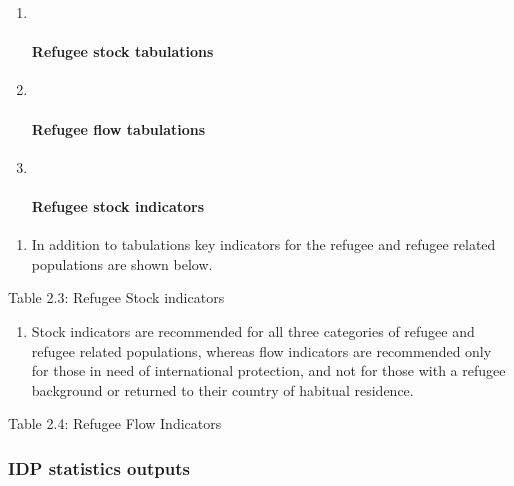 \documentclass[
]{article}
\providecommand{\tightlist}{%
  \setlength{\itemsep}{0pt}\setlength{\parskip}{0pt}}
\begin{document}
\begin{enumerate}
\def\labelenumi{\arabic{enumi})}
\item ~
  \hypertarget{refugee-stock-tabulations}{%
  \paragraph{Refugee stock tabulations}\label{refugee-stock-tabulations}}
\item ~
  \hypertarget{refugee-flow-tabulations}{%
  \paragraph{Refugee flow tabulations}\label{refugee-flow-tabulations}}
\item ~
  \hypertarget{refugee-stock-indicators}{%
  \paragraph{Refugee stock indicators}\label{refugee-stock-indicators}}
\end{enumerate}

\begin{enumerate}
\def\labelenumi{\arabic{enumi}.}
\setcounter{enumi}{61}
\tightlist
\item
  In addition to tabulations key indicators for the refugee and
  refugee related populations are shown below.
\end{enumerate}

Table 2.3: Refugee Stock indicators

\begin{enumerate}
\def\labelenumi{\arabic{enumi}.}
\setcounter{enumi}{62}
\tightlist
\item
  Stock indicators are recommended for all three categories of refugee
  and refugee related populations, whereas flow indicators are
  recommended only for those in need of international protection, and
  not for those with a refugee background or returned to their country
  of habitual residence.
\end{enumerate}

Table 2.4: Refugee Flow Indicators

\hypertarget{idp-statistics-outputs}{%
\subsubsection{IDP statistics outputs}\label{idp-statistics-outputs}}
\end{document}
